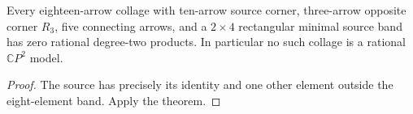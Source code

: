 \begin{corollary}
\label{CP2:A-ten-two-by-four-five-state-family}
Every eighteen-arrow collage with ten-arrow source corner,
three-arrow opposite corner $R_3$, five connecting arrows,
and a $2\times4$ rectangular minimal source band has zero
rational degree-two products.  In particular no such
collage is a rational $\mathbb CP^2$ model.
\end{corollary}
\begin{proof}
The source has precisely its identity and one other
element outside the eight-element band.  Apply the theorem.
\end{proof}
